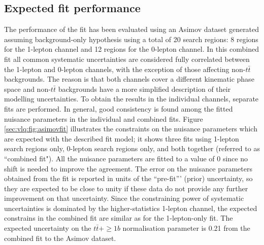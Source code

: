 \subsection{Expected fit performance}
\label{chp:vlq:sec:Asimovfit}
The performance of the fit has been evaluated using an Asimov dataset generated assuming background-only hypothesis using a total of 20 search regions: 8 regions for the 1-lepton channel and 12 regions for the 0-lepton channel. In this combined fit all common systematic uncertainties are considered fully correlated between the 1-lepton and 0-lepton channels, with the exception of those affecting non-$t\bar{t}$ backgrounds. The reason is that both channels cover a different kinematic phase space and non-$t\bar{t}$ backgrounds have a more simplified description of their modelling uncertainties. To obtain the results in the individual channels, separate fits are performed. In general, good consistency is found among the fitted nuisance parameters in the individual and combined fits. Figure \ref{sec:vlq:fig:asimovfit} illustrates the constraints on the nuisance parameters which are expected with the described fit model; it shows three fits using 1-lepton search regions only, 0-lepton search regions only, and both together (referred to as ``combined fit"). All the nuisance parameters are fitted to a value of 0 since no shift is needed to improve the agreement. The error on the nuisance parameters obtained from the fit is reported in units of the ``pre-fit''' (prior) uncertainty, so they are expected to be close to unity if these data do not provide any further improvement on that uncertainty. Since the constraining power of systematic uncertainties is dominated by the higher-statistics 1-lepton channel, the expected constrains in the combined fit are similar as for the 1-lepton-only fit. The expected uncertainty on the $t\bar{t}+\ge1b$ normalisation parameter is 0.21 from the combined fit to the Asimov dataset.\\

